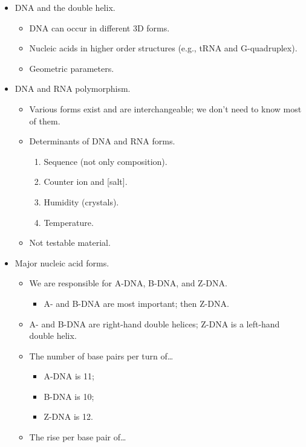 \documentclass[../notes.tex]{subfiles}
\begin{document}
\begin{itemize}
\begin{itemize}
\begin{itemize}
        \end{itemize}
    \end{itemize}
    \item DNA and the double helix.
    \begin{itemize}
        \item DNA can occur in different 3D forms.
        \item Nucleic acids in higher order structures (e.g., tRNA and G-quadruplex).
        \item Geometric parameters.
    \end{itemize}
    \item DNA and RNA polymorphism.
    \begin{itemize}
        \item Various forms exist and are interchangeable; we don't need to know most of them.
        \item Determinants of DNA and RNA forms.
        \begin{enumerate}
            \item Sequence (not only composition).
            \item Counter ion and [salt].
            \item Humidity (crystals).
            \item Temperature.
        \end{enumerate}
        \item Not testable material.
    \end{itemize}
    \item Major nucleic acid forms.
    \begin{itemize}
        \item We are responsible for A-DNA, B-DNA, and Z-DNA.
        \begin{itemize}
            \item A- and B-DNA are most important; then Z-DNA.
        \end{itemize}
        \item A- and B-DNA are right-hand double helices; Z-DNA is a left-hand double helix.
        \item The number of base pairs per turn of\dots
        \begin{itemize}
            \item A-DNA is 11;
            \item B-DNA is 10;
            \item Z-DNA is 12.
        \end{itemize}
        \item The rise per base pair of\dots

\end{itemize}
\end{itemize}
\end{document}

